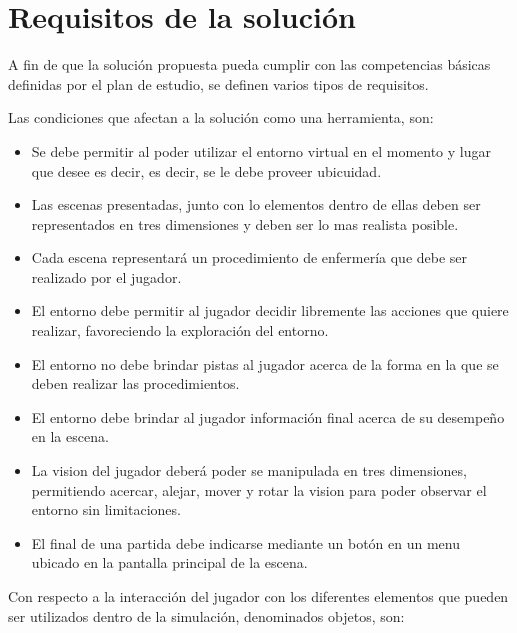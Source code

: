 \section{Requisitos de la solución}
\label{sec:requisitos}

A fin de que la solución propuesta pueda cumplir con las competencias básicas
definidas por el plan de estudio, se definen varios tipos de requisitos.

Las condiciones que afectan a la solución como una herramienta, son:

\begin{itemize}
    \item Se debe permitir al  poder utilizar el entorno virtual en el
    momento y lugar que desee es decir, es decir, se le debe proveer ubicuidad.
\item Las escenas presentadas, junto con lo elementos dentro de ellas deben ser
    representados en tres dimensiones y deben ser lo mas realista
    posible.
\item Cada escena representará un procedimiento de enfermería que debe ser
    realizado por el jugador.
\item El entorno debe permitir al jugador decidir libremente las acciones que
    quiere realizar, favoreciendo la exploración del entorno.
\item El entorno no debe brindar pistas al jugador acerca de la forma en la que
    se deben realizar las procedimientos.
\item El entorno debe brindar al jugador información final acerca de su
    desempeño en la escena.
\item La vision del jugador deberá poder se manipulada en tres dimensiones,
    permitiendo acercar, alejar, mover y rotar la vision para poder observar el
    entorno sin limitaciones.
\item El final de una partida debe indicarse mediante un botón en un menu
    ubicado en la pantalla principal de la escena.
\end{itemize}


Con respecto a la interacción del jugador con los diferentes elementos que
pueden ser utilizados dentro de la simulación, denominados objetos, son:

